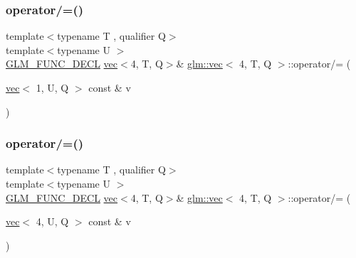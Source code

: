 \subsubsection{\texorpdfstring{operator/=()}{operator/=()}\hspace{0.1cm}{\footnotesize\ttfamily [2/6]}}
{\footnotesize\ttfamily template$<$typename T , qualifier Q$>$ \\
template$<$typename U $>$ \\
\mbox{\hyperlink{setup_8hpp_ab2d052de21a70539923e9bcbf6e83a51}{G\+L\+M\+\_\+\+F\+U\+N\+C\+\_\+\+D\+E\+CL}} \mbox{\hyperlink{structglm_1_1vec}{vec}}$<$4, T, Q$>$\& \mbox{\hyperlink{structglm_1_1vec}{glm\+::vec}}$<$ 4, T, Q $>$\+::operator/= (\begin{DoxyParamCaption}\item[{\mbox{\hyperlink{structglm_1_1vec}{vec}}$<$ 1, U, Q $>$ const \&}]{v }\end{DoxyParamCaption})}

\mbox{\label{structglm_1_1vec_3_014_00_01_t_00_01_q_01_4_aba90aef1a5d08c44f2ca6be9684bf1cd}} 
\subsubsection{\texorpdfstring{operator/=()}{operator/=()}\hspace{0.1cm}{\footnotesize\ttfamily [3/6]}}
{\footnotesize\ttfamily template$<$typename T , qualifier Q$>$ \\
template$<$typename U $>$ \\
\mbox{\hyperlink{setup_8hpp_ab2d052de21a70539923e9bcbf6e83a51}{G\+L\+M\+\_\+\+F\+U\+N\+C\+\_\+\+D\+E\+CL}} \mbox{\hyperlink{structglm_1_1vec}{vec}}$<$4, T, Q$>$\& \mbox{\hyperlink{structglm_1_1vec}{glm\+::vec}}$<$ 4, T, Q $>$\+::operator/= (\begin{DoxyParamCaption}\item[{\mbox{\hyperlink{structglm_1_1vec}{vec}}$<$ 4, U, Q $>$ const \&}]{v }\end{DoxyParamCaption})}

\mbox{\label{structglm_1_1vec_3_014_00_01_t_00_01_q_01_4_ab603e1376b20ee1ba7060973d0028adb}} 
